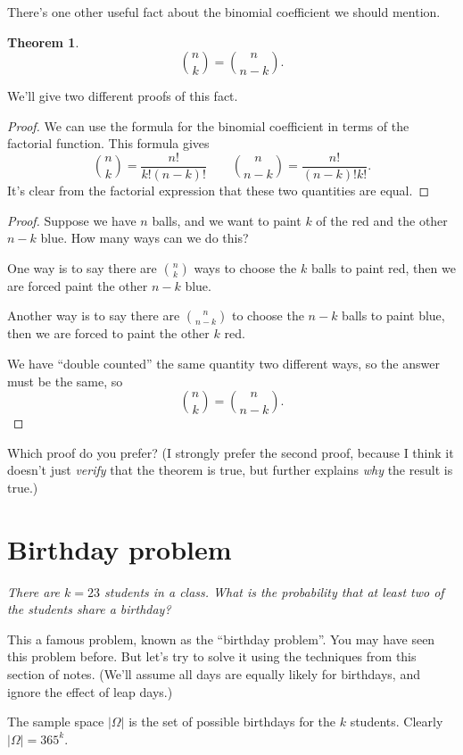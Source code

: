 \documentclass[
  a4paper,
]{book}
\newtheorem{theorem}{Theorem}[chapter]
\theoremstyle{definition}
\theoremstyle{definition}
\theoremstyle{definition}
\theoremstyle{definition}
\theoremstyle{remark}
\begin{document}
There's one other useful fact about the binomial coefficient we should mention.

\begin{theorem}
\[ \binom nk = \binom{n}{n-k}. \]
\end{theorem}

We'll give two different proofs of this fact.

\begin{proof}
We can use the formula for the binomial coefficient in terms of the factorial function. This formula gives
\[ \binom nk = \frac{n!}{k!(n-k)!} \qquad \binom{n}{n-k} = \frac{n!}{(n-k)!k!} . \]
It's clear from the factorial expression that these two quantities are equal.
\end{proof}

\begin{proof}
Suppose we have \(n\) balls, and we want to paint \(k\) of the red and the other \(n-k\) blue. How many ways can we do this?

One way is to say there are \(\binom nk\) ways to choose the \(k\) balls to paint red, then we are forced paint the other \(n - k\) blue.

Another way is to say there are \(\binom{n}{n-k}\) to choose the \(n-k\) balls to paint blue, then we are forced to paint the other \(k\) red.

We have ``double counted'' the same quantity two different ways, so the answer must be the same, so
\[ \binom nk = \binom{n}{n-k}. \]
\end{proof}

Which proof do you prefer? (I strongly prefer the second proof, because I think it doesn't just \emph{verify} that the theorem is true, but further explains \emph{why} the result is true.)

\hypertarget{birthday}{%
\section{Birthday problem}\label{birthday}}

\emph{There are \(k = 23\) students in a class. What is the probability that at least two of the students share a birthday?}

This a famous problem, known as the ``birthday problem''. You may have seen this problem before. But let's try to solve it using the techniques from this section of notes. (We'll assume all days are equally likely for birthdays, and ignore the effect of leap days.)

The sample space \(|\Omega|\) is the set of possible birthdays for the \(k\) students. Clearly \(|\Omega| = 365^k\).
\end{document}
